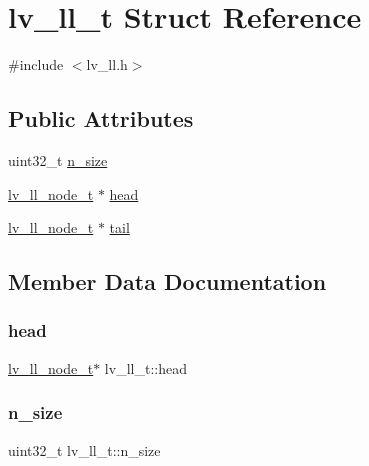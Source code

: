 \hypertarget{structlv__ll__t}{}\section{lv\+\_\+ll\+\_\+t Struct Reference}
\label{structlv__ll__t}


{\ttfamily \#include $<$lv\+\_\+ll.\+h$>$}

\subsection*{Public Attributes}
\begin{DoxyCompactItemize}
\item 
uint32\+\_\+t \mbox{\hyperlink{structlv__ll__t_a8dbe5afd50ad7e26e8035330f811cb57}{n\+\_\+size}}
\item 
\mbox{\hyperlink{lv__ll_8h_aaaf22c8c1939f8ea17c80be0b1e9f299}{lv\+\_\+ll\+\_\+node\+\_\+t}} $\ast$ \mbox{\hyperlink{structlv__ll__t_a9ed0ab1e930216ea787109442877abfc}{head}}
\item 
\mbox{\hyperlink{lv__ll_8h_aaaf22c8c1939f8ea17c80be0b1e9f299}{lv\+\_\+ll\+\_\+node\+\_\+t}} $\ast$ \mbox{\hyperlink{structlv__ll__t_a633fc5158edd17d0e02f108a6fe042ad}{tail}}
\end{DoxyCompactItemize}


\subsection{Member Data Documentation}
\mbox{\label{structlv__ll__t_a9ed0ab1e930216ea787109442877abfc}} 
\subsubsection{\texorpdfstring{head}{head}}
{\footnotesize\ttfamily \mbox{\hyperlink{lv__ll_8h_aaaf22c8c1939f8ea17c80be0b1e9f299}{lv\+\_\+ll\+\_\+node\+\_\+t}}$\ast$ lv\+\_\+ll\+\_\+t\+::head}

\mbox{\label{structlv__ll__t_a8dbe5afd50ad7e26e8035330f811cb57}} 
\subsubsection{\texorpdfstring{n\_size}{n\_size}}
{\footnotesize\ttfamily uint32\+\_\+t lv\+\_\+ll\+\_\+t\+::n\+\_\+size}

